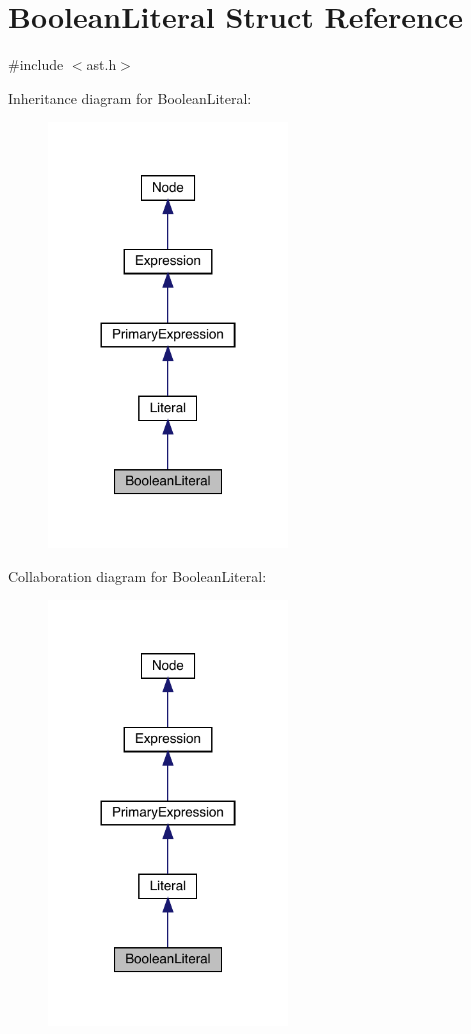 \hypertarget{struct_boolean_literal}{}\section{Boolean\+Literal Struct Reference}
\label{struct_boolean_literal}


{\ttfamily \#include $<$ast.\+h$>$}



Inheritance diagram for Boolean\+Literal\+:
\nopagebreak
\begin{figure}[H]
\begin{center}
\leavevmode
\includegraphics[width=180pt]{struct_boolean_literal__inherit__graph}
\end{center}
\end{figure}


Collaboration diagram for Boolean\+Literal\+:
\nopagebreak
\begin{figure}[H]
\begin{center}
\leavevmode
\includegraphics[width=180pt]{struct_boolean_literal__coll__graph}
\end{center}
\end{figure}
